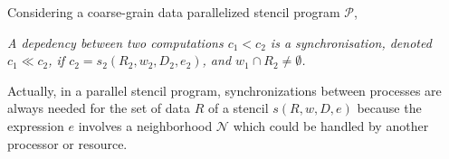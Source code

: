 Considering a coarse-grain data parallelized stencil program $\mathcal{P}$,

\medskip
\begin{mydef}
\textit{A depedency between two computations $c_1<c_2$ is a \textit{synchronisation}, denoted $c_1 \ll c_2$, if $c_2=s_2(R_2,w_2,D_2,e_2)$, and $w_1 \cap R_2 \neq \emptyset$.}
\end{mydef}

\medskip
Actually, in a parallel stencil program, synchronizations between processes are always needed for the set of data $R$ of a stencil $s(R,w,D,e)$ because the expression $e$ involves a neighborhood $\mathcal{N}$ which could be handled by another processor or resource.


